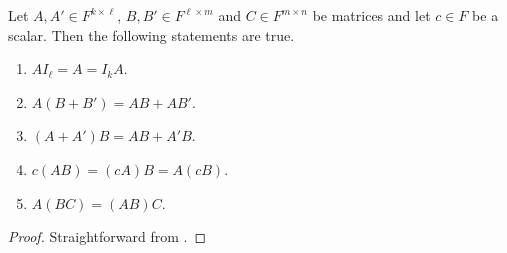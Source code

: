 \begin{theorem}
  \label{thm:composition}
  Let $A, A' \in F^{k \times \ell}$, $B, B' \in F^{\ell \times m}$ and
  $C \in F^{m \times n}$ be matrices and let $c \in F$ be a scalar.
  Then the following statements are true.
  \begin{enumerate}
    \item $AI_\ell = A = I_kA$.
    \item $A(B + B') = AB + AB'$.
    \item $(A + A')B = AB + A'B$.
    \item $c(AB) = (cA)B = A(cB)$.
    \item $A(BC) = (AB)C$.
  \end{enumerate}
\end{theorem}
\begin{proof}
  Straightforward from .
\end{proof}